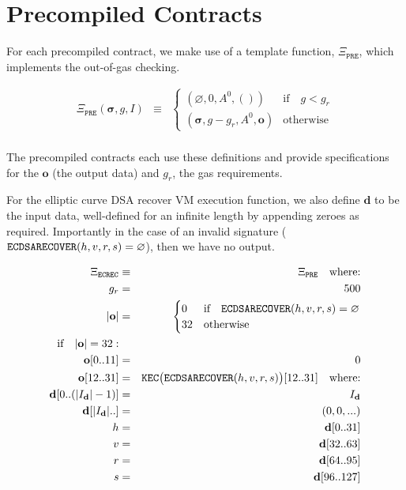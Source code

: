 \documentclass[9pt,oneside]{amsart}
\begin{document}
\section{Precompiled Contracts}\label{app:precompiled}

For each precompiled contract, we make use of a template function, $\Xi_{\mathtt{PRE}}$, which implements the out-of-gas checking.

\begin{eqnarray}
\Xi_{\mathtt{PRE}}(\boldsymbol{\sigma}, g, I) & \equiv & \begin{cases}
(\varnothing, 0, A^0, ()) & \text{if} \quad g < g_r \\
(\boldsymbol\sigma, g - g_r, A^0, \mathbf{o}) & \text{otherwise}\end{cases} \\
\end{eqnarray}

The precompiled contracts each use these definitions and provide specifications for the $\mathbf{o}$ (the output data) and $g_r$, the gas requirements.

For the elliptic curve DSA recover VM execution function, we also define $\mathbf{d}$ to be the input data, well-defined for an infinite length by appending zeroes as required. Importantly in the case of an invalid signature ($\mathtt{\tiny ECDSARECOVER}(h, v, r, s) = \varnothing$), then we have no output.

\begin{eqnarray}
\Xi_{\mathtt{ECREC}} &\equiv& \Xi_{\mathtt{PRE}} \quad \text{where:} \\
g_r &=& 500\\
|\mathbf{o}| &=& \begin{cases} 0 & \text{if} \quad \mathtt{\tiny ECDSARECOVER}(h, v, r, s) = \varnothing\\ 32 & \text{otherwise} \end{cases}\\
\text{if} \quad |\mathbf{o}| = 32: &&\\
\mathbf{o}[0..11] &=& 0 \\
\mathbf{o}[12..31] &=& \mathtt{\tiny KEC}\big(\mathtt{\tiny ECDSARECOVER}(h, v, r, s)\big)[12..31] \quad \text{where:}\\
\mathbf{d}[0..(|I_\mathbf{d}|-1)] &=& I_\mathbf{d}\\
\mathbf{d}[|I_\mathbf{d}|..] &=& (0, 0, ...) \\
h &=& \mathbf{d}[0..31]\\
v &=& \mathbf{d}[32..63]\\
r &=& \mathbf{d}[64..95]\\
s &=& \mathbf{d}[96..127]
\end{eqnarray}
\end{document}
